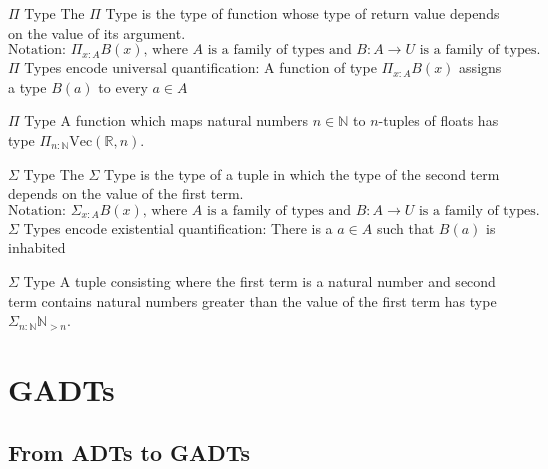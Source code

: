 \documentclass[
	aspectratio=169, %
	8pt, %
]{beamer}
\begin{document}
\begin{frame}{\insertsubsection}
		\begin{definition}{$\Pi$ Type}
					The $\Pi$ Type is the type of function whose type of return value depends on the value of its argument.
					\begin{equation*}
									\text{Notation: }\Pi_{x:A} B(x) \text{, where } A \text{ is a family of types and } B : A \rightarrow U \text{ is a family of types.}
					\end{equation*}
					$\Pi$ Types encode universal quantification: A function of type $\Pi_{x:A} B(x)$ assigns a type $B(a)$ to every $a \in A$
		\end{definition}

		\begin{example}{$\Pi$ Type}
						A function which maps natural numbers $n \in \mathbb{N}$ to $n$-tuples of floats has type $\Pi_{n: \mathbb{N}} \text{Vec}(\mathbb{R}, n)$.
		\end{example}

\end{frame}

\begin{frame}{\insertsubsection}
		\begin{definition}{$\Sigma$ Type}
						The $\Sigma$ Type is the type of a tuple in which the type of the second term depends on the value of the first term.
						\begin{equation*}
										\text{Notation: }\Sigma_{x:A} B(x) \text{, where } A \text{ is a family of types and } B : A \rightarrow U \text{ is a family of types.}
						\end{equation*}
						$\Sigma$ Types encode existential quantification: There is a $a \in A$ such that $B(a)$ is inhabited 
		\end{definition}
		\begin{example}{$\Sigma$ Type}
						A tuple consisting where the first term is a natural number and second term contains natural numbers greater than the value of the first term has type $\Sigma_{n: \mathbb{N}} \mathbb{N}_{>n}$.
		\end{example}
\end{frame}

\section{GADTs}

\subsection{From ADTs to GADTs}
\end{document}
